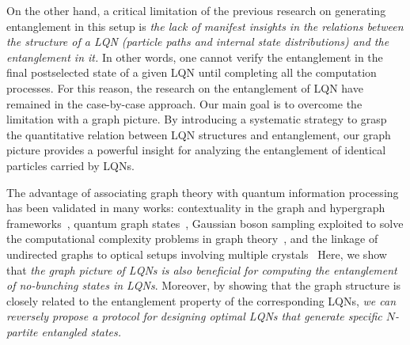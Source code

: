 \documentclass[a4paper,twocolumn,8pt,accepted=2021-12-15]{quantumarticle}
\newcommand{\blue}{\textcolor{blue}}
\begin{document}
		On the other hand, a critical limitation of the previous research on generating entanglement in this setup is \emph{the lack of manifest insights in the relations between the structure of a LQN (particle paths and internal state distributions) and the entanglement in it.} In other words, one cannot verify the entanglement in the final postselected state of a given LQN until completing all the computation processes. For this reason, the research on the entanglement of LQN have remained in the case-by-case approach. Our main goal is to overcome the limitation with a graph picture. By introducing a systematic strategy to grasp the quantitative relation between LQN structures and entanglement, our graph picture provides a powerful insight for analyzing the entanglement of identical particles carried by LQNs.
	
	The advantage of associating graph theory with quantum information processing has been validated in many works: contextuality in the graph and hypergraph frameworks~\cite{cabello2014graph,acin2015combinatorial}, quantum graph states~\cite{dur2003multiparticle,hein2004multiparty, van2005local,hein2006entanglement}, Gaussian boson sampling exploited to solve the computational complexity problems in graph theory~\cite{bradler2018gaussian,arrazola2018using,bradler2021graph}, and  the linkage of undirected graphs to optical setups involving multiple crystals~\cite{krenn2017quantum,gu2019quantum,gu2019quantum2,gu2020quantum}
	Here, we show that \emph{the graph picture of LQNs is also beneficial for computing the entanglement of no-bunching states in LQNs}. Moreover, by showing that the graph structure is closely related to the entanglement property of the corresponding LQNs, \emph{we can reversely propose a protocol for designing optimal LQNs that generate specific $N$-partite entangled states.} 
	
	
\end{document}
